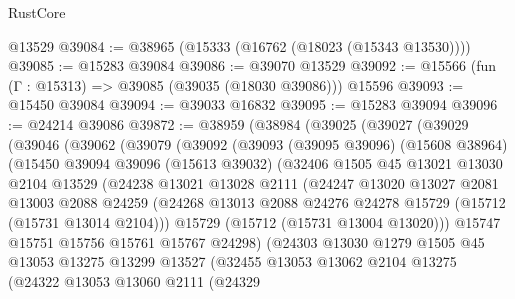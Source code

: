 \begin{lexlean}{RustCore}
\begin{coremodule}
    @13529
@39084 := @38965 (@15333 (@16762 (@18023 (@15343 @13530))))
@39085 := @15283 @39084
@39086 := @39070 @13529
@39092 := @15566 (fun (Γ : @15313) => @39085 (@39035 (@18030 @39086))) @15596
@39093 := @15450 @39084
@39094 := @39033 @16832
@39095 := @15283 @39094
@39096 := @24214 @39086
@39872 := @38959
    (@38984
      (@39025
        (@39027
          (@39029
            (@39046
              (@39062
                (@39079
                  (@39092
                    (@39093
                      (@39095 @39096)
                      (@15608 @38964)
                      (@15450
                        @39094
                        @39096
                        (@15613 @39032)
                        (@32406
                          @1505
                          @45
                          @13021
                          @13030
                          @2104
                          @13529
                          (@24238
                            @13021
                            @13028
                            @2111
                            (@24247
                              @13020
                              @13027
                              @2081
                              @13003
                              @2088
                              @24259
                              (@24268
                                @13013
                                @2088
                                @24276
                                @24278
                                @15729
                                (@15712 (@15731 @13014 @2104)))
                              @15729
                              (@15712 (@15731 @13004 @13020)))
                            @15747
                            @15751
                            @15756
                            @15761
                            @15767
                            @24298)
                          (@24303
                            @13030
                            @1279
                            @1505
                            @45
                            @13053
                            @13275
                            @13299
                            @13527
                            (@32455
                              @13053
                              @13062
                              @2104
                              @13275
                              (@24322
                                @13053
                                @13060
                                @2111
                                (@24329

\end{coremodule}
\end{lexlean}
